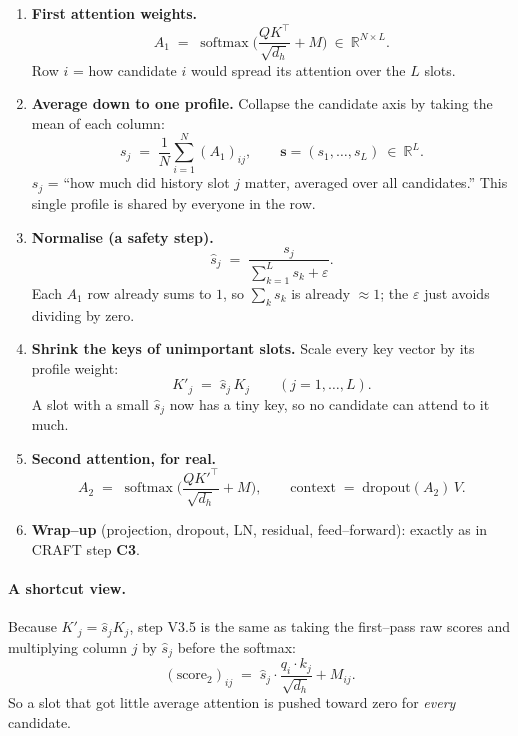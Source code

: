 \documentclass[11pt]{article}
\newcommand{\R}{\mathbb{R}}
\newcommand{\softmax}{\operatorname{softmax}}
\newcommand{\LN}{\mathrm{LN}}
\begin{document}
\begin{enumerate}[label=\textbf{V3.\arabic*},leftmargin=3.6em]
  \item \textbf{First attention weights.}
        \[
          A_1 \;=\; \softmax\!\Big(\frac{QK^{\top}}{\sqrt{d_h}} + M\Big)\ \in\ \R^{N\times L}.
        \]
        Row $i$ = how candidate $i$ would spread its attention over the $L$ slots.

  \item \textbf{Average down to one profile.} Collapse the candidate axis by
        taking the mean of each column:
        \[
          s_j \;=\; \frac{1}{N}\sum_{i=1}^{N}(A_1)_{ij},
          \qquad \bm{s}=(s_1,\dots,s_L)\ \in\ \R^{L}.
        \]
        $s_j$ = ``how much did history slot $j$ matter, averaged over all
        candidates.'' This single profile is shared by everyone in the row.

  \item \textbf{Normalise (a safety step).}
        \[
          \hat{s}_j \;=\; \frac{s_j}{\sum_{k=1}^{L} s_k + \varepsilon}.
        \]
        Each $A_1$ row already sums to $1$, so $\sum_k s_k$ is already $\approx 1$;
        the $\varepsilon$ just avoids dividing by zero.

  \item \textbf{Shrink the keys of unimportant slots.} Scale every key vector by
        its profile weight:
        \[
          K'_j \;=\; \hat{s}_j\, K_j \qquad (j=1,\dots,L).
        \]
        A slot with a small $\hat{s}_j$ now has a tiny key, so no candidate can
        attend to it much.

  \item \textbf{Second attention, for real.}
        \[
          A_2 \;=\; \softmax\!\Big(\frac{QK'^{\top}}{\sqrt{d_h}} + M\Big),
          \qquad
          \text{context} \;=\; \mathrm{dropout}(A_2)\,V.
        \]

  \item \textbf{Wrap--up} (projection, dropout, $\LN$, residual, feed--forward):
        exactly as in CRAFT step \textbf{C3}.
\end{enumerate}

\paragraph{A shortcut view.} Because $K'_j=\hat{s}_j K_j$, step V3.5 is the same
as taking the first--pass raw scores and multiplying column $j$ by $\hat{s}_j$
before the softmax:
\[
  (\text{score}_2)_{ij} \;=\; \hat{s}_j\cdot\frac{q_i\cdot k_j}{\sqrt{d_h}} + M_{ij}.
\]
So a slot that got little average attention is pushed toward zero for
\emph{every} candidate.
\end{document}
